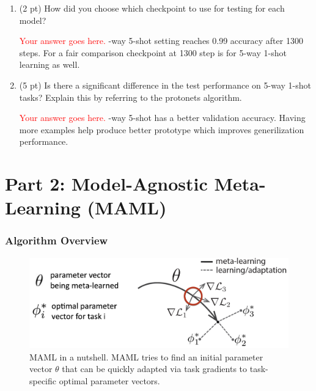 \documentclass[12pt]{article}
\begin{document}
\begin{enumerate}
\begin{enumerate}
        \break
        \item (2 pt) How did you choose which checkpoint to use for testing for each model?
        
        \textcolor{red}{Your answer goes here.}
        -way 5-shot setting reaches 0.99 accuracy after 1300 steps. For a fair comparison checkpoint at 1300 step is for 5-way 1-shot learning as well.

        \item (5 pt) Is there a significant difference in the test performance on 5-way 1-shot tasks? Explain this by referring to the protonets algorithm.
        
        \textcolor{red}{Your answer goes here.}
        -way 5-shot has a better validation accuracy. Having more examples help produce better prototype which improves generilization performance.
    \end{enumerate}
    
    

\end{enumerate}



\newpage
\section*{Part 2: Model-Agnostic Meta-Learning (MAML)~\cite{maml}}

\subsubsection*{Algorithm Overview}

\begin{figure}[H]
\centering
\includegraphics[width=0.8\linewidth]{figures/MAML.png}
\vspace{-3mm}
\caption{MAML in a nutshell. MAML tries to find an initial parameter vector $\theta$ that can be quickly adapted via task gradients to task-specific optimal parameter vectors.}
\label{fig:maml}
\end{figure}
\end{document}

